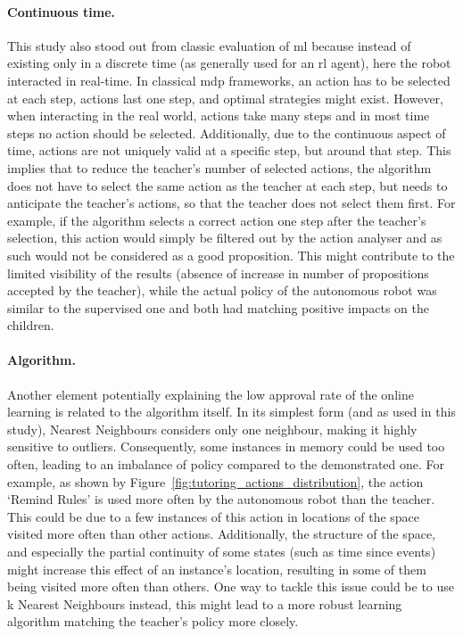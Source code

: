 \paragraph{Continuous time.}
This study also stood out from classic evaluation of \gls{ml} because instead of existing only in a discrete time (as generally used for an \gls{rl} agent), here the robot interacted in real-time. In classical \gls{mdp} frameworks, an action has to be selected at each step, actions last one step, and optimal strategies might exist. However, when interacting in the real world, actions take many steps and in most time steps no action should be selected. Additionally, due to the continuous aspect of time, actions are not uniquely valid at a specific step, but around that step. This implies that to reduce the teacher's number of selected actions, the algorithm does not have to select the same action as the teacher at each step, but needs to anticipate the teacher's actions, so that the teacher does not select them first. For example, if the algorithm selects a correct action one step after the teacher's selection, this action would simply be filtered out by the action analyser and as such would not be considered as a good proposition. This might contribute to the limited visibility of the results (absence of increase in number of propositions accepted by the teacher), while the actual policy of the autonomous robot was similar to the supervised one and both had matching positive impacts on the children.

\paragraph{Algorithm.}
Another element potentially explaining the low approval rate of the online learning is related to the algorithm itself. In its simplest form (and as used in this study), Nearest Neighbours considers only one neighbour, making it highly sensitive to outliers. Consequently, some instances in memory could be used too often, leading to an imbalance of policy compared to the demonstrated one. For example, as shown by Figure~\ref{fig:tutoring_actions_distribution}, the action `Remind Rules' is used more often by the autonomous robot than the teacher. This could be due to a few instances of this action in locations of the space visited more often than other actions. Additionally, the structure of the space, and especially the partial continuity of some states (such as time since events) might increase this effect of an instance's location, resulting in some of them being visited more often than others. One way to tackle this issue could be to use k Nearest Neighbours instead, this might lead to a more robust learning algorithm matching the teacher's policy more closely.

